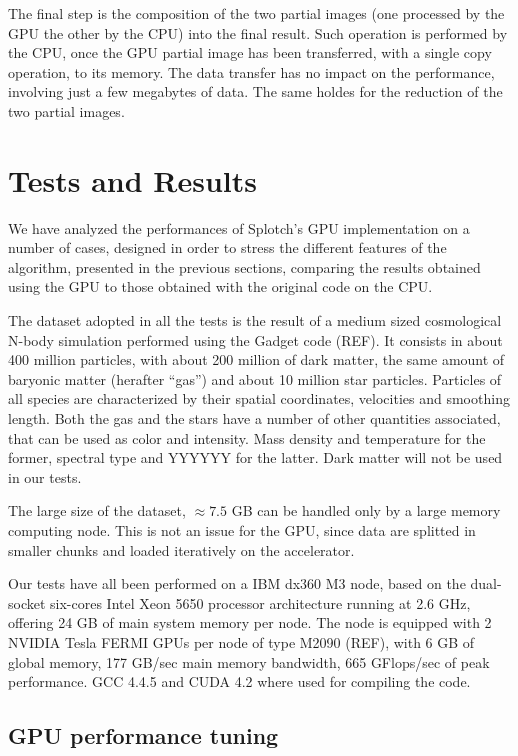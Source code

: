 \documentclass[11pt]{article}
\begin{document}
The final step is the composition of the two partial images (one processed by the
GPU the other by the CPU) into the final result. 
Such operation is performed by the CPU, 
once the GPU partial image has been transferred, with a single copy operation, to
its memory. The data transfer has no impact on the performance, involving just a few 
megabytes of data. The same holdes for the reduction of the two partial images.   

\section{Tests and Results}

We have analyzed the performances of Splotch's GPU implementation on a number of cases, designed in 
order to stress the different features of the algorithm, presented in the previous 
sections, comparing the results 
obtained using the GPU to those obtained with the original code on the CPU. 

The dataset adopted in all the tests is the result of a medium sized cosmological 
N-body simulation performed using the Gadget code (REF). It consists in about 
400 million particles, with about 200 million of dark matter, the same amount 
of baryonic matter (herafter ``gas'') and about 10 million star particles. 
Particles of all species are characterized by their spatial coordinates, velocities
and smoothing length. 
Both the gas and the stars have a number of other quantities associated, that can be used 
as color and intensity. Mass density and temperature for the former, spectral type and YYYYYY
for the latter. Dark matter will not be used in our tests.

The large size of the dataset, $\approx 7.5$ GB can be handled only by a large memory computing node. 
This is not an issue for the GPU, since data are splitted 
in smaller chunks and loaded iteratively on the accelerator. 

Our tests have all been performed on a IBM dx360 M3 node, based on the dual-socket 
six-cores Intel Xeon 5650 processor architecture running at 2.6 GHz, 
offering 24 GB of main system memory per node. The node is equipped with 2 NVIDIA 
Tesla FERMI GPUs per node of type M2090 (REF), with 6 GB of global memory, 177 GB/sec 
main memory bandwidth, 665 GFlops/sec of peak performance. GCC 4.4.5 and CUDA 4.2 
where used for compiling the code.

\subsection{GPU performance tuning}
\end{document}
